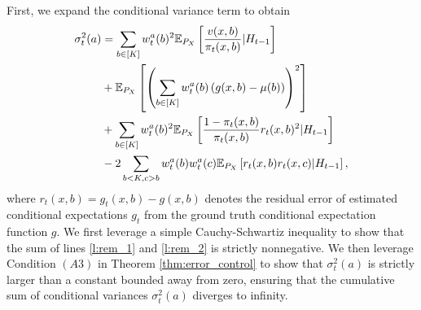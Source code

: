 \documentclass{article}
\begin{document}
\begin{appendices}

First, we expand the conditional variance term to obtain
\begin{align}
        \sigma_t^2(a) &= \sum_{b \in [K]}w_t^a(b)^2 \mathbb{E}_{P_X}\left[\frac{v(x,b)}{\pi_t(x,b)} | H_{t-1}\right]\label{l:expected_vars} \\
        & + \mathbb{E}_{P_X}\left[\left(\sum_{b \in [K]}w_t^a(b) \left(g(x,b) - \mu(b)\right) \right)^2 \right]\label{l:conditional_vars}\\
        & + \sum_{b \in [K]} w_t^a(b)^2\mathbb{E}_{P_X}\left[\frac{1 - \pi_t(x,b)}{\pi_t(x,b)}r_t(x,b)^2 | H_{t-1}\right]\label{l:rem_1} \\
        & - 2\sum_{b < K, c > b} w_t^a(b)w_t^a(c)\mathbb{E}_{P_X}\left[r_t(x,b)r_t(x,c)|H_{t-1}\right]\label{l:rem_2},
\end{align}
where $r_t(x,b) = g_t(x,b) - g(x,b)$ denotes the residual error of estimated conditional expectations $g_t$ from the ground truth conditional expectation function $g$. We first leverage a simple Cauchy-Schwartiz inequality to show that the sum of lines \eqref{l:rem_1} and \eqref{l:rem_2} is strictly nonnegative. We then leverage Condition $(A3)$ in Theorem \ref{thm:error_control} to show that $\sigma_t^2(a)$ is strictly larger than a constant bounded away from zero, ensuring that the cumulative sum of conditional variances $\sigma_t^2(a)$ diverges to infinity. 



\end{appendices}
\end{document}
